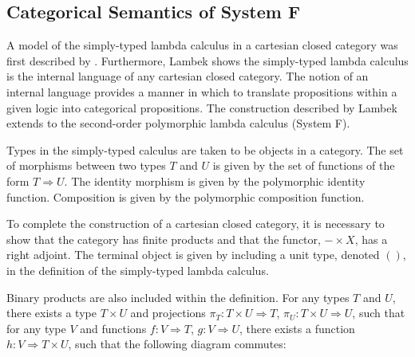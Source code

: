 \documentclass[../../Dissertation.tex]{subfiles}
\begin{document}
\subsection{Categorical Semantics of System F}\label{sec:systemfcat}
A model of the simply-typed lambda calculus in a cartesian closed category was first described by . Furthermore, Lambek shows the simply-typed lambda calculus is the internal language of any cartesian closed category. The notion of an internal language provides a manner in which to translate propositions within a given logic into categorical propositions. The construction described by Lambek extends to the second-order polymorphic lambda calculus (System F).
\par
Types in the simply-typed calculus are taken to be objects in a category. The set of morphisms between two types $T$ and $U$ is given by the set of functions of the form $T \Rightarrow U$. The identity morphism is given by the polymorphic identity function. Composition is given by the polymorphic composition function.
\par
To complete the construction of a cartesian closed category, it is necessary to show that the category has finite products and that the functor, $- \times X$, has a right adjoint. The terminal object is given by including a unit type, denoted $()$, in the definition of the simply-typed lambda  calculus. 
\par
Binary products are also included within the definition. For any types $T$ and $U$, there exists a type $T \times U$ and projections $\pi_{T} : T \times U \Rightarrow T$, $\pi_{U} : T \times U \Rightarrow U$, such that for any type $V$ and functions $f : V \Rightarrow T$, $g : V \Rightarrow U$, there exists a function $h : V \Rightarrow T \times U$, such that the following diagram commutes:
\end{document}
